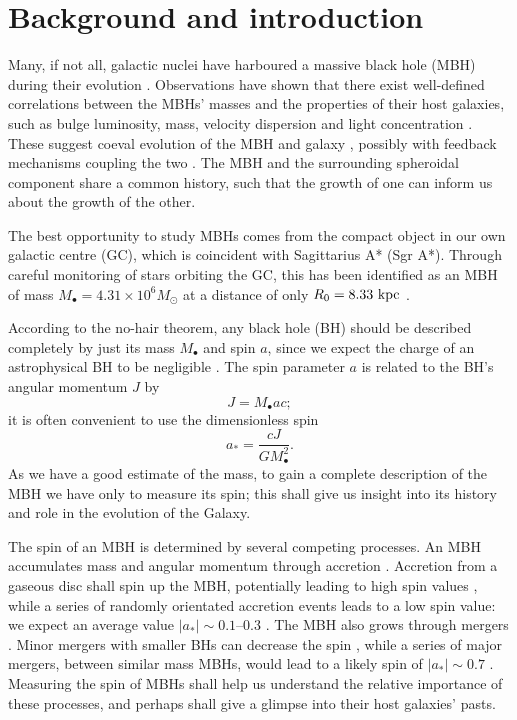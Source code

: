 \section{Background and introduction}\label{sec:Intro}

Many, if not all, galactic nuclei have harboured a massive black hole (MBH) during their evolution \citep{Lynden-Bell1971, Soltan1982, Rees1984}. Observations have shown that there exist well-defined correlations between the MBHs' masses and the properties of their host galaxies, such as bulge luminosity, mass, velocity dispersion and light concentration \citep{Kormendy1995, Magorrian1998, Ferrarese2000, Gebhardt2000, Graham2001, Tremaine2002, Marconi2003, Haring2004, Graham2007, Graham2011}. These suggest coeval evolution of the MBH and galaxy \citep{Peng2007, Jahnke2011}, possibly with feedback mechanisms coupling the two \citep{Haiman2004, Volonteri2009}. The MBH and the surrounding spheroidal component share a common history, such that the growth of one can inform us about the growth of the other.

The best opportunity to study MBHs comes from the compact object in our own galactic centre (GC), which is coincident with Sagittarius A* (Sgr A*). Through careful monitoring of stars orbiting the GC, this has been identified as an MBH of mass $M_\bullet = 4.31 \times 10^6 M_\odot$ at a distance of only $R_0 = 8.33~\mathrm{kpc}$ \citep{Gillessen2009}.

According to the no-hair theorem, any black hole (BH) should be described completely by just its mass $M_\bullet$ and spin $a$, since we expect the charge of an astrophysical BH to be negligible \citep{Israel1967, Israel1968, Carter1971, Hawking1972, Robinson1975, Chandrasekhar1998}. The spin parameter $a$ is related to the BH's angular momentum $J$ by
\begin{equation}
J = M_\bullet ac;
\end{equation}
it is often convenient to use the dimensionless spin
\begin{equation}
a_\ast = \frac{cJ}{GM_\bullet^2}.
\end{equation}
As we have a good estimate of the mass, to gain a complete description of the MBH we have only to measure its spin; this shall give us insight into its history and role in the evolution of the Galaxy.

The spin of an MBH is determined by several competing processes. An MBH accumulates mass and angular momentum through accretion \citep{Volonteri2010}. Accretion from a gaseous disc shall spin up the MBH, potentially leading to high spin values \citep{Volonteri2005}, while a series of randomly orientated accretion events leads to a low spin value: we expect an average value $|a_\ast| \sim 0.1$--$0.3$ \citep{King2006, King2008}. The MBH also grows through mergers \citep{Yu2002, Malbon2007}. Minor mergers with smaller BHs can decrease the spin \citep{Hughes2003, Gammie2004}, while a series of major mergers, between similar mass MBHs, would lead to a likely spin of $|a_\ast| \sim 0.7$ \citep{Berti2008, Berti2007, Gonzalez2007}. Measuring the spin of MBHs shall help us understand the relative importance of these processes, and perhaps shall give a glimpse into their host galaxies' pasts.

